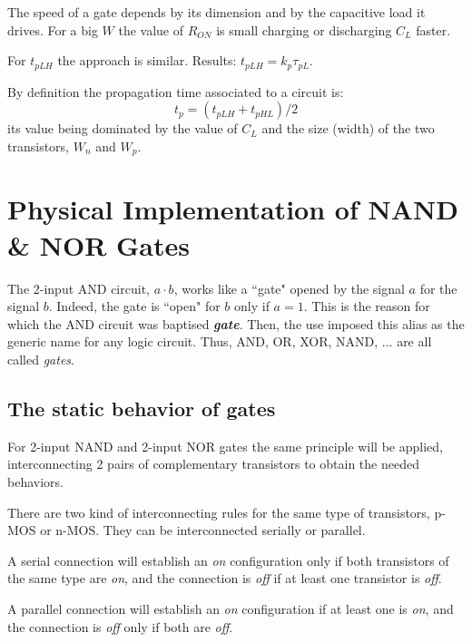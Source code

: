 The speed of a gate depends by its dimension and by the capacitive load
it drives. For a big $W$ the value of $R_{ON}$ is small charging or
discharging $C_{L}$ faster.

For $t_{pLH}$ the approach is similar. Results: $t_{pLH} = k_p \tau_{pL}$.

By definition the propagation time associated to a circuit is: $$t_p = (t_{pLH} + t_{pHL})/2$$
its value being dominated by the value of $C_L$ and the size (width) of the two transistors, $W_n$ and $W_p$.



\section{Physical Implementation of NAND \& NOR Gates}

The 2-input AND circuit, $a \cdot b$, works like a ``gate" opened by the signal $a$ for the signal $b$. Indeed, the gate is ``open" for $b$ only if $a = 1$. This is the reason for which the AND circuit was baptised {\bf {\em gate}}. Then, the use imposed this alias as the generic name for any logic circuit. Thus, AND, OR, XOR, NAND, ... are all called {\em gates}.


\subsection{The static behavior of gates}


For 2-input NAND and 2-input NOR gates the same principle will be
applied, interconnecting 2 pairs of complementary transistors to
obtain the needed behaviors.

There are two kind of interconnecting rules for the same type of
transistors, p-MOS or n-MOS. They can be interconnected serially
or parallel.

A serial connection will establish an {\em on} configuration only
if both transistors of the same type are {\em on}, and the
connection is {\em off} if at least one transistor is {\em off}.

A parallel connection will establish an {\em on} configuration if
at least one is {\em on}, and the connection is {\em off} only if
both are {\em off}.


